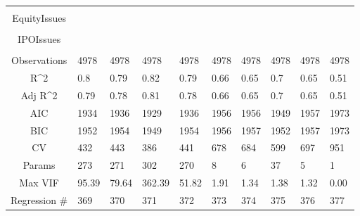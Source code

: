\documentclass{article}
\begin{document}
\begin{table}[H]
\begin{tabular}{|clllllllll|}
   &  &  &  &  &  &  &  &  &  \\ 
  EquityIssues &  &  &  &  &  &  &  &  &  \\ 
   &  &  &  &  &  &  &  &  &  \\ 
  IPOIssues &  &  &  &  &  &  &  &  &  \\ 
   &  &  &  &  &  &  &  &  &  \\ 
  \hline 
 Observations & 4978 & 4978 & 4978 & 4978 & 4978 & 4978 & 4978 & 4978 & 4978 \\ 
  R^2 & 0.8 & 0.79 & 0.82 & 0.79 & 0.66 & 0.65 & 0.7 & 0.65 & 0.51 \\ 
  Adj R^2 & 0.79 & 0.78 & 0.81 & 0.78 & 0.66 & 0.65 & 0.7 & 0.65 & 0.51 \\ 
  AIC & 1934 & 1936 & 1929 & 1936 & 1956 & 1956 & 1949 & 1957 & 1973 \\ 
  BIC & 1952 & 1954 & 1949 & 1954 & 1956 & 1957 & 1952 & 1957 & 1973 \\ 
  CV & 432 & 443 & 386 & 441 & 678 & 684 & 599 & 697 & 951 \\ 
  Params & 273 & 271 & 302 & 270 & 8 & 6 & 37 & 5 & 1 \\ 
  Max VIF & 95.39 & 79.64 & 362.39 & 51.82 & 1.91 & 1.34 & 1.38 & 1.32 & 0.00 \\ 
  Regression \# & 369 & 370 & 371 & 372 & 373 & 374 & 375 & 376 & 377 \\ 
   \hline
\end{tabular}
 
\end{table}
\end{document}
